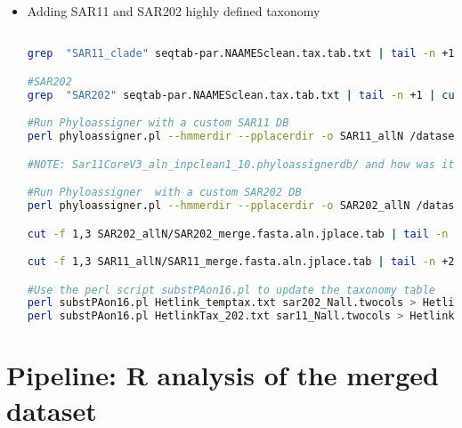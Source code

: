 \documentclass{article}
\begin{document}
\begin{itemize}
\begin{lstlisting}[language=bash]
cut -f 1,378-383 Hetlink_final_collapsedV.otu > Hetlink_temptax.txt #Get the Heterotrophic Taxonomic Table to add highly defined SAR11 and SAR202

\end{lstlisting}
\item{Adding SAR11 and SAR202 highly defined taxonomy}
\begin{lstlisting}[language=bash]

grep  "SAR11_clade" seqtab-par.NAAMESclean.tax.tab.txt | tail -n +1 | cut -f 1,2 | sed "s/^N/>N/" | sed "s/\t/\n/" > SAR11_merge.fasta

#SAR202
grep  "SAR202" seqtab-par.NAAMESclean.tax.tab.txt | tail -n +1 | cut -f 1,2 | sed "s/^N/>N/" | sed "s/\t/\n/" > SAR202_merge.fasta

#Run Phyloassigner with a custom SAR11 DB 
perl phyloassigner.pl --hmmerdir --pplacerdir -o SAR11_allN /datasets/SAR11_full/Sar11CoreV3_aln_inpclean1_10.phyloassignerdb/ SAR11_merge.fasta

#NOTE: Sar11CoreV3_aln_inpclean1_10.phyloassignerdb/ and how was it created is provided in this repository. Check folder SAR11DB

#Run Phyloassigner  with a custom SAR202 DB
perl phyloassigner.pl --hmmerdir --pplacerdir -o SAR202_allN /datasets/SAR202/ss_aln.phyloassignerdb/ SAR202_merge.fasta

cut -f 1,3 SAR202_allN/SAR202_merge.fasta.aln.jplace.tab | tail -n +2 > sar202_Nall.twocols

cut -f 1,3 SAR11_allN/SAR11_merge.fasta.aln.jplace.tab | tail -n +2 > sar11_Nall.twocols

#Use the perl script substPAon16.pl to update the taxonomy table
perl substPAon16.pl Hetlink_temptax.txt sar202_Nall.twocols > HetlinkTax_202.txt
perl substPAon16.pl HetlinkTax_202.txt sar11_Nall.twocols > HetlinkTax_202_11.txt
\end{lstlisting}

\end{itemize}

\section{Pipeline: R analysis of the merged dataset}
\end{document}
